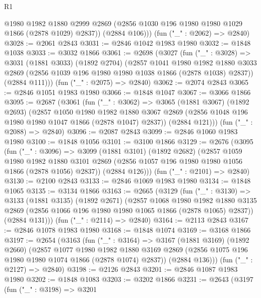 \begin{lexlean}{R1}
\begin{coremodule}
          @1980
          @1982
          @1880
          @2999
          @2869
          (@2856 @1030 @196 @1980 @1980 @1029 @1866 (@2878 @1029) @2837))
        (@2884 @106)))
    (fun ("_" : @2062) => @2840)
@3028 := @2061 @2843
@3031 := @2846 @1042 @1983 @1980
@3032 := @1848 @1038
@3033 := @3032 @1866
@3061 := @2698
    (@3027
      (fun ("_" : @3028) =>
      @3031
        (@1881 @3033)
        (@1892 @2704)
        (@2857
          @1041
          @1980
          @1982
          @1880
          @3033
          @2869
          (@2856 @1039 @196 @1980 @1980 @1038 @1866 (@2878 @1038) @2837))
        (@2884 @111)))
    (fun ("_" : @2075) => @2840)
@3062 := @2074 @2843
@3065 := @2846 @1051 @1983 @1980
@3066 := @1848 @1047
@3067 := @3066 @1866
@3095 := @2687
    (@3061
      (fun ("_" : @3062) =>
      @3065
        (@1881 @3067)
        (@1892 @2693)
        (@2857
          @1050
          @1980
          @1982
          @1880
          @3067
          @2869
          (@2856 @1048 @196 @1980 @1980 @1047 @1866 (@2878 @1047) @2837))
        (@2884 @121)))
    (fun ("_" : @2088) => @2840)
@3096 := @2087 @2843
@3099 := @2846 @1060 @1983 @1980
@3100 := @1848 @1056
@3101 := @3100 @1866
@3129 := @2676
    (@3095
      (fun ("_" : @3096) =>
      @3099
        (@1881 @3101)
        (@1892 @2682)
        (@2857
          @1059
          @1980
          @1982
          @1880
          @3101
          @2869
          (@2856 @1057 @196 @1980 @1980 @1056 @1866 (@2878 @1056) @2837))
        (@2884 @126)))
    (fun ("_" : @2101) => @2840)
@3130 := @2100 @2843
@3133 := @2846 @1069 @1983 @1980
@3134 := @1848 @1065
@3135 := @3134 @1866
@3163 := @2665
    (@3129
      (fun ("_" : @3130) =>
      @3133
        (@1881 @3135)
        (@1892 @2671)
        (@2857
          @1068
          @1980
          @1982
          @1880
          @3135
          @2869
          (@2856 @1066 @196 @1980 @1980 @1065 @1866 (@2878 @1065) @2837))
        (@2884 @131)))
    (fun ("_" : @2114) => @2840)
@3164 := @2113 @2843
@3167 := @2846 @1078 @1983 @1980
@3168 := @1848 @1074
@3169 := @3168 @1866
@3197 := @2654
    (@3163
      (fun ("_" : @3164) =>
      @3167
        (@1881 @3169)
        (@1892 @2660)
        (@2857
          @1077
          @1980
          @1982
          @1880
          @3169
          @2869
          (@2856 @1075 @196 @1980 @1980 @1074 @1866 (@2878 @1074) @2837))
        (@2884 @136)))
    (fun ("_" : @2127) => @2840)
@3198 := @2126 @2843
@3201 := @2846 @1087 @1983 @1980
@3202 := @1848 @1083
@3203 := @3202 @1866
@3231 := @2643
    (@3197
      (fun ("_" : @3198) =>
      @3201

\end{coremodule}
\end{lexlean}
